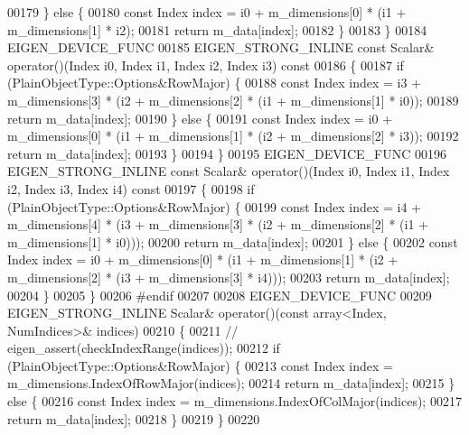 \begin{DoxyCode}
00179       \} \textcolor{keywordflow}{else} \{
00180          \textcolor{keyword}{const} Index index = i0 + m\_dimensions[0] * (i1 + m\_dimensions[1] * i2);
00181         \textcolor{keywordflow}{return} m\_data[index];
00182       \}
00183     \}
00184     EIGEN\_DEVICE\_FUNC
00185     EIGEN\_STRONG\_INLINE \textcolor{keyword}{const} Scalar& operator()(Index i0, Index i1, Index i2, Index i3)\textcolor{keyword}{ const}
00186 \textcolor{keyword}{    }\{
00187       \textcolor{keywordflow}{if} (PlainObjectType::Options&RowMajor) \{
00188         \textcolor{keyword}{const} Index index = i3 + m\_dimensions[3] * (i2 + m\_dimensions[2] * (i1 + m\_dimensions[1] * i0));
00189         \textcolor{keywordflow}{return} m\_data[index];
00190       \} \textcolor{keywordflow}{else} \{
00191         \textcolor{keyword}{const} Index index = i0 + m\_dimensions[0] * (i1 + m\_dimensions[1] * (i2 + m\_dimensions[2] * i3));
00192         \textcolor{keywordflow}{return} m\_data[index];
00193       \}
00194     \}
00195     EIGEN\_DEVICE\_FUNC
00196     EIGEN\_STRONG\_INLINE \textcolor{keyword}{const} Scalar& operator()(Index i0, Index i1, Index i2, Index i3, Index i4)\textcolor{keyword}{ const}
00197 \textcolor{keyword}{    }\{
00198       \textcolor{keywordflow}{if} (PlainObjectType::Options&RowMajor) \{
00199         \textcolor{keyword}{const} Index index = i4 + m\_dimensions[4] * (i3 + m\_dimensions[3] * (i2 + m\_dimensions[2] * (i1 + 
      m\_dimensions[1] * i0)));
00200         \textcolor{keywordflow}{return} m\_data[index];
00201       \} \textcolor{keywordflow}{else} \{
00202         \textcolor{keyword}{const} Index index = i0 + m\_dimensions[0] * (i1 + m\_dimensions[1] * (i2 + m\_dimensions[2] * (i3 + 
      m\_dimensions[3] * i4)));
00203         \textcolor{keywordflow}{return} m\_data[index];
00204       \}
00205     \}
00206 \textcolor{preprocessor}{#endif}
00207 
00208     EIGEN\_DEVICE\_FUNC
00209     EIGEN\_STRONG\_INLINE Scalar& operator()(\textcolor{keyword}{const} array<Index, NumIndices>& indices)
00210     \{
00211       \textcolor{comment}{//      eigen\_assert(checkIndexRange(indices));}
00212       \textcolor{keywordflow}{if} (PlainObjectType::Options&RowMajor) \{
00213         \textcolor{keyword}{const} Index index = m\_dimensions.IndexOfRowMajor(indices);
00214         \textcolor{keywordflow}{return} m\_data[index];
00215       \} \textcolor{keywordflow}{else} \{
00216         \textcolor{keyword}{const} Index index = m\_dimensions.IndexOfColMajor(indices);
00217         \textcolor{keywordflow}{return} m\_data[index];
00218       \}
00219     \}
00220 

\end{DoxyCode}

